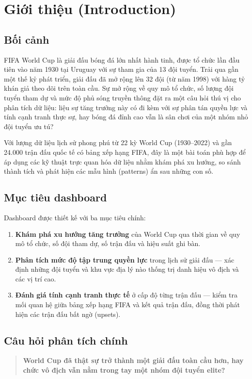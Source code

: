 \documentclass[12pt,a4paper]{article}
\begin{document}

\section{Giới thiệu (Introduction)}

\subsection{Bối cảnh}
FIFA World Cup là giải đấu bóng đá lớn nhất hành tinh, được tổ chức lần đầu tiên vào năm 1930 tại Uruguay với sự tham gia của 13 đội tuyển. Trải qua gần một thế kỷ phát triển, giải đấu đã mở rộng lên 32 đội (từ năm 1998) với hàng tỷ khán giả theo dõi trên toàn cầu. Sự mở rộng về quy mô tổ chức, số lượng đội tuyển tham dự và mức độ phủ sóng truyền thông đặt ra một câu hỏi thú vị cho phân tích dữ liệu: liệu sự tăng trưởng này có đi kèm với sự phân tán quyền lực và tính cạnh tranh thực sự, hay bóng đá đỉnh cao vẫn là sân chơi của một nhóm nhỏ đội tuyển ưu tú?

Với lượng dữ liệu lịch sử phong phú từ 22 kỳ World Cup (1930--2022) và gần 24.000 trận đấu quốc tế có bảng xếp hạng FIFA, đây là một bài toán phù hợp để áp dụng các kỹ thuật trực quan hóa dữ liệu nhằm khám phá xu hướng, so sánh thành tích và phát hiện các mẫu hình (patterns) ẩn sau những con số.

\subsection{Mục tiêu dashboard}
Dashboard được thiết kế với ba mục tiêu chính:
\begin{enumerate}
    \item \textbf{Khám phá xu hướng tăng trưởng} của World Cup qua thời gian về quy mô tổ chức, số đội tham dự, số trận đấu và hiệu suất ghi bàn.
    \item \textbf{Phân tích mức độ tập trung quyền lực} trong lịch sử giải đấu --- xác định những đội tuyển và khu vực địa lý nào thống trị danh hiệu vô địch và các vị trí cao.
    \item \textbf{Đánh giá tính cạnh tranh thực tế} ở cấp độ từng trận đấu --- kiểm tra mối quan hệ giữa bảng xếp hạng FIFA và kết quả trận đấu, đồng thời phát hiện các trận đấu bất ngờ (upsets).
\end{enumerate}

\subsection{Câu hỏi phân tích chính}
\begin{quote}
    \textbf{World Cup đã thật sự trở thành một giải đấu toàn cầu hơn, hay chức vô địch vẫn nằm trong tay một nhóm đội tuyển elite?}
\end{quote}
\end{document}
